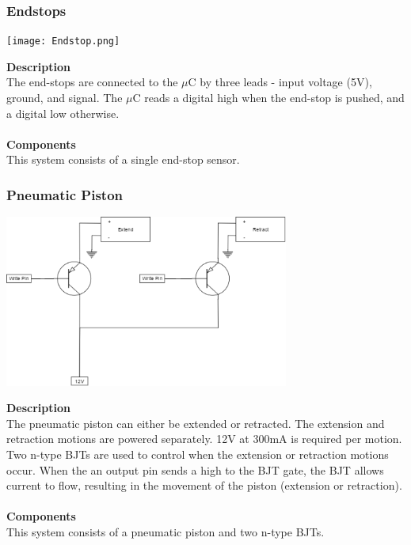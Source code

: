 \documentclass[titlepage]{article}
\begin{document}
\newpage
\subsubsection{Endstops}
\begin{center}
	\texttt{[image: Endstop.png]}
\label{fig:elecContextDiagramFig}
\end{center}
\textbf{Description}\\
The end-stops are connected to the $\mu$C by three leads - input voltage (5V), ground, and signal. The $\mu$C reads a digital high when the end-stop is pushed, and a digital low otherwise.\\\\
\textbf{Components}\\
This system consists of a single end-stop sensor.

\subsubsection{Pneumatic Piston}
\begin{center}
	\includegraphics[width = 0.7\textwidth]{PneumaticPiston.png}
\label{fig:PneumaticPistonFig}
\end{center}
\textbf{Description}\\
The pneumatic piston can either be extended or retracted. The extension and retraction motions are powered separately. 12V at 300mA is required per motion. Two n-type BJTs are used to control when the extension or retraction motions occur. When the an output pin sends a high to the BJT gate, the BJT allows current to flow, resulting in the movement of the piston (extension or retraction).\\\\
\textbf{Components}\\
This system consists of a pneumatic piston and two n-type BJTs.
\end{document}
